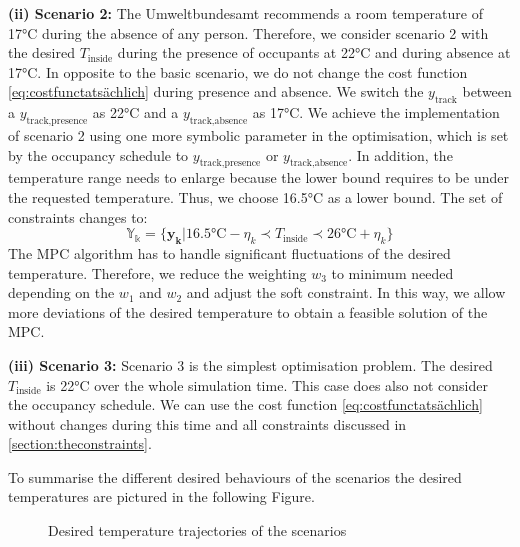 \textbf{(ii) Scenario 2:}\newline
The Umweltbundesamt \cite{Umweltbundesamt.7.10.2021} recommends a room temperature of 17°C during the absence of any person. Therefore, we consider scenario 2 with the desired $T_\text{inside}$ during the presence of occupants at 22°C and during absence at 17°C. In opposite to the basic scenario, we do not change the cost function \ref{eq:costfunctatsächlich} during presence and absence. We switch the $y_\text{track}$ between a $y_\text{track,presence}$ as 22°C and a $y_\text{track,absence}$ as 17°C. We achieve the implementation of scenario 2 using one more symbolic parameter in the optimisation, which is set by the occupancy schedule to $y_\text{track,presence}$ or $y_\text{track,absence}$. In addition, the temperature range needs to enlarge because the lower bound requires to be under the requested temperature. Thus, we choose 16.5°C as a lower bound. The set of constraints changes to:
\begin{equation}
    \label{ConstraintYScenario2}
    \mathbb{Y_k} = \{\mathbf{y_k}| 16.5 \text{°C} - \eta_k \prec T_\text{inside} \prec 26 \text{°C}+ \eta_k\} 
\end{equation}
The MPC algorithm has to handle significant fluctuations of the desired temperature. Therefore, we reduce the weighting $w_\text{3}$ to minimum needed depending on the $w_\text{1}$ and $w_\text{2}$ and adjust the soft constraint. In this way, we allow more deviations of the desired temperature to obtain a feasible solution of the MPC. \newline 

\textbf{(iii) Scenario 3:}\newline
Scenario 3 is the simplest optimisation problem. The desired $T_\text{inside}$ is 22°C over the whole simulation time. This case does also not consider the occupancy schedule. We can use the cost function \ref{eq:costfunctatsächlich} without changes during this time and all constraints discussed in \autoref{section:theconstraints}.\newline

To summarise the different desired behaviours of the scenarios the desired temperatures are pictured in the following Figure.
    \begin{figure}[H]
           \centering
        \def\svgwidth{1.1\textwidth}
        
        \caption{Desired temperature trajectories of the scenarios}
         \label{fig:Solltemperaturverlauf}
    \end{figure}


